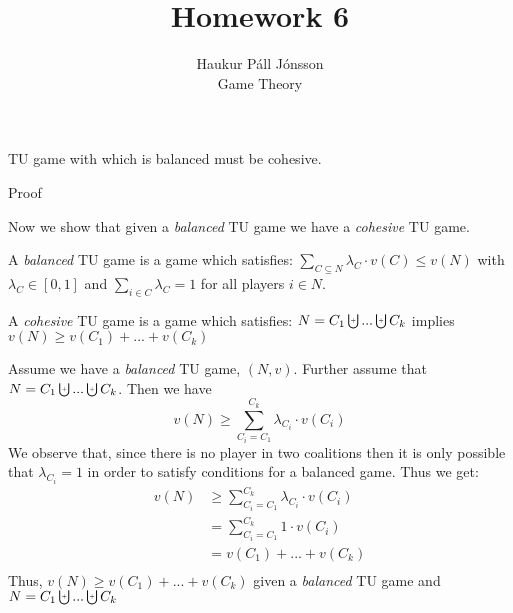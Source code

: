 \documentclass[12pt]{article}
\newenvironment{question}[2][Question]{\begin{trivlist}
\item[\hskip \labelsep {\bfseries #1}\hskip \labelsep {\bfseries #2.}]}{\end{trivlist}}
\newenvironment{answer}[2][Answer]{\begin{trivlist}
\item[\hskip \labelsep {\bfseries #1}\hskip \labelsep {\bfseries #2:}]}{\end{trivlist}}
\begin{document}
\renewcommand{\theenumi}{\roman{enumi}}

\let\oldsum\sum
\renewcommand{\sum}[3]{\oldsum\limits_{#1}^{#2}#3}
\let\oldprod\prod
\renewcommand{\prod}[3]{\oldprod\limits_{#1}^{#2}#3}

\newcommand\Dunion{
  \mathop{\mathchoice
    {\ooalign{$\displaystyle\bigcup$\cr\hss\scalebox{.65}{\raisebox{0.45ex}{\sffamily +}}\hss}}
    {\ooalign{$\textstyle\bigcup$\cr\hss\scalebox{.9}{\raisebox{0.5ex}{\tiny\sffamily +}}\hss}}
    {\ooalign{$\scriptstyle\bigcup$\cr\hss\scalebox{.45}{\raisebox{0.3ex}{\sffamily +}}\hss}}
    {\ooalign{$\scriptscriptstyle\bigcup$\cr\hss\scalebox{.38}{\raisebox{0.3ex}{\sffamily +}}\hss}}
    }
}

\title{Homework 6}
\author{Haukur Páll Jónsson\\
Game Theory}

\maketitle

\begin{question}{1}
TU game with which is balanced must be cohesive.
\end{question}
\begin{answer}{a)}{Proof}

Now we show that given a \textit{balanced} TU game we have a \textit{cohesive} TU game.

A \textit{balanced} TU game is a game which satisfies: $\sum{C \subseteq N}{}{\lambda_C \cdot v(C)} \leq v(N)$ with $\lambda_C \in [0,1]$ and $\sum{i \in C}{}{\lambda_C}=1$ for all players $i \in N$.

A \textit{cohesive} TU game is a game which satisfies: $N = C_1 \Dunion ... \Dunion C_k$ implies $v(N) \geq v(C_1) + ... + v(C_k)$

Assume we have a \textit{balanced} TU game, $(N,v)$. Further assume that $N = C_1 \Dunion ... \Dunion C_k$. Then we have
$$v(N) \geq \sum{C_i =C_1}{C_k}{\lambda_{C_i} \cdot v(C_i)}$$
We observe that, since there is no player in two coalitions then it is only possible that $\lambda_{C_i}=1$ in order to satisfy conditions for a balanced game. Thus we get:
\begin{align*}
v(N) &\geq \sum{C_i =C_1}{C_k}{\lambda_{C_i} \cdot v(C_i)} \\
&= \sum{C_i =C_1}{C_k}{1 \cdot v(C_i)} \\
&= v(C_1) + ... + v(C_k) \\
\end{align*}
Thus, $v(N) \geq v(C_1) + ... + v(C_k)$ given a \textit{balanced} TU game and $N = C_1 \Dunion ... \Dunion C_k$
\end{answer}
\end{document}
